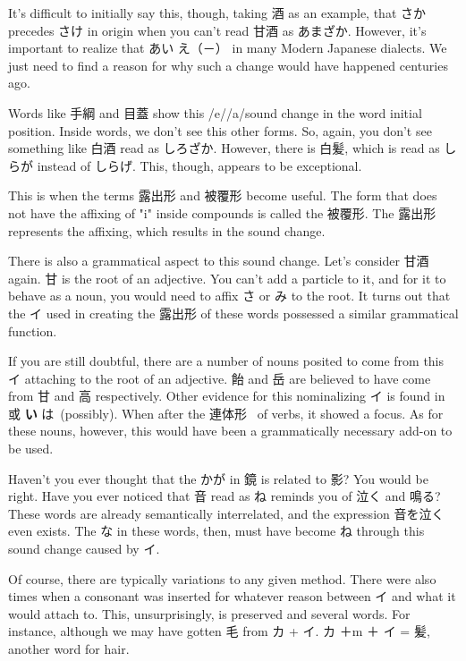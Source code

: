 \par{ It's difficult to initially say this, though, taking 酒 as an example, that さか precedes さけ in origin when you can't read 甘酒 as あまざか. However, it's important to realize that あい \textrightarrow  え（－） in many Modern Japanese dialects. We just need to find a reason for why such a change would have happened centuries ago. }

\par{ Words like 手綱 and 目蓋 show this \slash e\slash  \textrightarrow  \slash a\slash  sound change in the word initial position. Inside words, we don't see this other forms. So, again, you don't see something like 白酒 read as しろざか. However, there is 白髪, which is read as しらが instead of しらげ. This, though, appears to be exceptional. }

\par{ This is when the terms 露出形 and 被覆形 become useful. The form that does not have the affixing of "i" inside compounds is called the 被覆形. The 露出形 represents the affixing, which results in the sound change. }

\par{ There is also a grammatical aspect to this sound change. Let's consider 甘酒 again. 甘 is the root of an adjective. You can't add a particle to it, and for it to behave as a noun, you would need to affix さ or み to the root. It turns out that the イ used in creating the 露出形 of these words possessed a similar grammatical function. }

\par{ If you are still doubtful, there are a number of nouns posited to come from this イ attaching to the root of an adjective. 飴 and 岳 are believed to have come from 甘 and 高 respectively. Other evidence for this nominalizing イ is found in 或 \textbf{い }は (possibly). When after the 連体形  of verbs, it showed a focus. As for these nouns, however, this would have been a grammatically necessary add-on to be used. }

\par{ Haven't you ever thought that the かが in 鏡 is related to 影? You would be right. Have you ever noticed that 音 read as ね reminds you of 泣く and 鳴る? These words are already semantically interrelated, and the expression 音を泣く even exists. The な in these words, then, must have become ね through this sound change caused by イ. }

\par{  Of course, there are typically variations to any given method. There were also times when a consonant was inserted for whatever reason between イ and what it would attach to. This, unsurprisingly, is preserved and several words. For instance, although we may have gotten 毛 from カ + イ. カ ＋m ＋ イ = 髪, another word for hair. }

